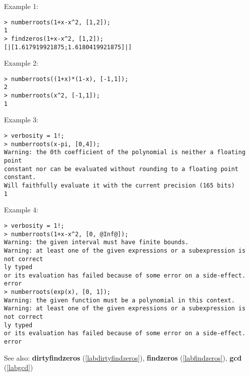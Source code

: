 \noindent Example 1: 
\begin{center}\begin{minipage}{15cm}\begin{Verbatim}[frame=single]
> numberroots(1+x-x^2, [1,2]);
1
> findzeros(1+x-x^2, [1,2]);
[|[1.617919921875;1.6180419921875]|]
\end{Verbatim}
\end{minipage}\end{center}
\noindent Example 2: 
\begin{center}\begin{minipage}{15cm}\begin{Verbatim}[frame=single]
> numberroots((1+x)*(1-x), [-1,1]);
2
> numberroots(x^2, [-1,1]);
1
\end{Verbatim}
\end{minipage}\end{center}
\noindent Example 3: 
\begin{center}\begin{minipage}{15cm}\begin{Verbatim}[frame=single]
> verbosity = 1!;
> numberroots(x-pi, [0,4]);
Warning: the 0th coefficient of the polynomial is neither a floating point
constant nor can be evaluated without rounding to a floating point constant.
Will faithfully evaluate it with the current precision (165 bits) 
1
\end{Verbatim}
\end{minipage}\end{center}
\noindent Example 4: 
\begin{center}\begin{minipage}{15cm}\begin{Verbatim}[frame=single]
> verbosity = 1!;
> numberroots(1+x-x^2, [0, @Inf@]);
Warning: the given interval must have finite bounds.
Warning: at least one of the given expressions or a subexpression is not correct
ly typed
or its evaluation has failed because of some error on a side-effect.
error
> numberroots(exp(x), [0, 1]);
Warning: the given function must be a polynomial in this context.
Warning: at least one of the given expressions or a subexpression is not correct
ly typed
or its evaluation has failed because of some error on a side-effect.
error
\end{Verbatim}
\end{minipage}\end{center}
See also: \textbf{dirtyfindzeros} (\ref{labdirtyfindzeros}), \textbf{findzeros} (\ref{labfindzeros}), \textbf{gcd} (\ref{labgcd})
